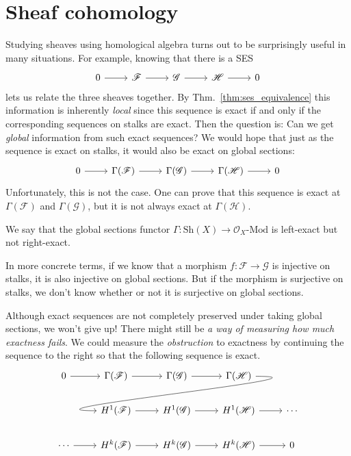\documentclass[12pt]{article}
\begin{document}
\section{Sheaf cohomology}
Studying sheaves using homological algebra turns out to be surprisingly
useful in many situations. For example, knowing that there is a SES
\[
  \begin{tikzcd}
    0 \arrow{r} & \mathcal{F} \arrow{r} & \mathcal{G} \arrow{r} &
    \mathcal{H} \arrow{r} & 0
  \end{tikzcd}
\]
lets us relate the three sheaves together. By Thm.~\ref{thm:ses_equivalence}
this information is inherently \emph{local} since this sequence is exact
if and only if the corresponding sequences on stalks are exact.
Then the question is: Can we get \emph{global} information from
such exact sequences? We would hope that just as the sequence is exact
on stalks, it would also be exact on global sections:
\[
  \begin{tikzcd}
    0 \arrow{r} & \Gamma(\mathcal{F}) \arrow{r} & \Gamma(\mathcal{G})
    \arrow{r} & \Gamma(\mathcal{H}) \arrow{r} & 0
  \end{tikzcd}
\]
Unfortunately, this is not the case. One can prove that this sequence
is exact at $\Gamma(\mathcal{F})$ and $\Gamma(\mathcal{G})$, but it
is not always exact at $\Gamma(\mathcal{H})$.
\begin{cat}
  We say that the global sections functor $\Gamma: \text{Sh}(X)\to \mathcal{O}_{X}\text{-Mod}$ is left-exact but not right-exact.
\end{cat}
In more concrete terms, if we know that a morphism $f: \mathcal{F}
\to\mathcal{G}$ is injective on stalks, it is also injective on
global sections. But if the morphism is surjective on stalks, we don't
know whether or not it is surjective on global sections.

Although exact sequences are not completely preserved under taking
global sections, we won't give up! There might still be \emph{a way of
measuring how much exactness fails}. We could measure the
\emph{obstruction} to exactness by continuing the sequence to the right
so that the following sequence is exact.
\[
  \begin{tikzcd}
    0 \arrow{r} & \Gamma(\mathcal{F}) \arrow{r} & \Gamma(\mathcal{G})
    \arrow{r} & \Gamma(\mathcal{H})
    \arrow[out=0, in=180, looseness=1.5, overlay]{dll} & \\
     & H^{1}(\mathcal{F}) \arrow{r} & H^{1}(\mathcal{G})
    \arrow{r} & H^{1}(\mathcal{H}) \arrow{r} & \cdots \\
    \cdots \arrow{r}& H^{k}(\mathcal{F}) \arrow{r} & H^{k}(\mathcal{G})
    \arrow{r} & H^{k}(\mathcal{H}) \arrow{r} & 0
  \end{tikzcd}
\]
\end{document}

